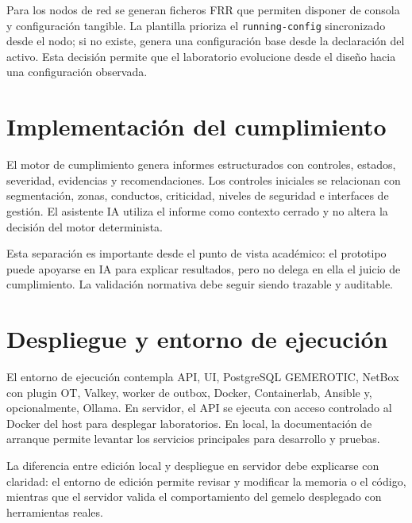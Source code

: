 Para los nodos de red se generan ficheros FRR que permiten disponer de consola y configuración tangible. La plantilla prioriza el \texttt{running-config} sincronizado desde el nodo; si no existe, genera una configuración base desde la declaración del activo. Esta decisión permite que el laboratorio evolucione desde el diseño hacia una configuración observada.

\section{Implementación del cumplimiento} \label{sec:implementacion-cumplimiento}

El motor de cumplimiento genera informes estructurados con controles, estados, severidad, evidencias y recomendaciones. Los controles iniciales se relacionan con segmentación, zonas, conductos, criticidad, niveles de seguridad e interfaces de gestión. El asistente IA utiliza el informe como contexto cerrado y no altera la decisión del motor determinista.

Esta separación es importante desde el punto de vista académico: el prototipo puede apoyarse en IA para explicar resultados, pero no delega en ella el juicio de cumplimiento. La validación normativa debe seguir siendo trazable y auditable.

\section{Despliegue y entorno de ejecución} \label{sec:despliegue-entorno}

El entorno de ejecución contempla API, UI, PostgreSQL GEMEROTIC, NetBox con plugin OT, Valkey, worker de outbox, Docker, Containerlab, Ansible y, opcionalmente, Ollama. En servidor, el API se ejecuta con acceso controlado al Docker del host para desplegar laboratorios. En local, la documentación de arranque permite levantar los servicios principales para desarrollo y pruebas.

La diferencia entre edición local y despliegue en servidor debe explicarse con claridad: el entorno de edición permite revisar y modificar la memoria o el código, mientras que el servidor valida el comportamiento del gemelo desplegado con herramientas reales.
